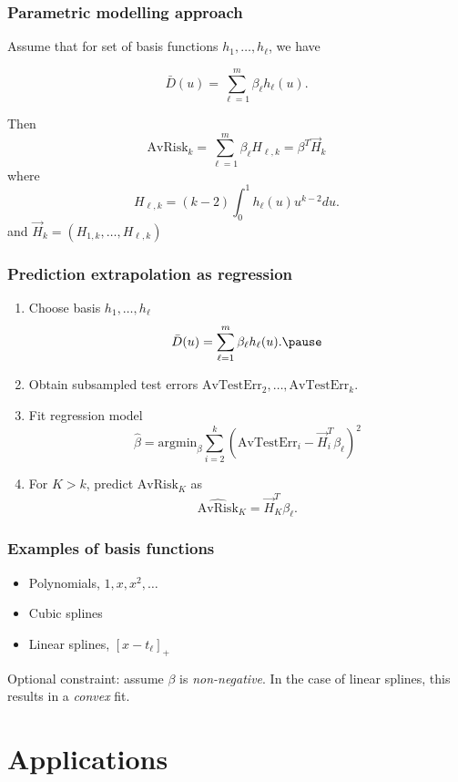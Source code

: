 \documentclass{beamer}
\newcommand{\argmin}{\text{argmin}}
\begin{document}
\begin{frame}
\frametitle{Parametric modelling approach}
Assume that for set of basis functions $h_1,\hdots, h_\ell$, we have

\[
\bar{D}(u) = \sum_{\ell = 1}^m \beta_\ell h_\ell(u).
\]

Then
\[
\text{AvRisk}_{k} = \sum_{\ell = 1}^m \beta_\ell H_{\ell,k} = \beta^T \vec{H}_k
\]
where
\[
H_{\ell,k} = (k-2) \int_0^1 h_\ell(u) u^{k-2} du.
\]
and $\vec{H}_k = (H_{1,k},\hdots, H_{\ell, k})$
\end{frame}

\begin{frame}
\frametitle{Prediction extrapolation as regression}
\begin{enumerate}
\item Choose basis $h_1,\hdots, h_\ell$
\[
\bar{D}(u) = \sum_{\ell = 1}^m \beta_\ell h_\ell(u).\pause
\]
\item Obtain subsampled test errors $\text{AvTestErr}_2,\hdots, \text{AvTestErr}_k$.\pause
\item Fit regression model
\[
\hat{\beta} = \argmin_\beta \sum_{i=2}^{k} \left(\text{AvTestErr}_i - \vec{H}_i^T \beta_\ell\right)^2
\]\pause
\item For $K > k$, predict $\text{AvRisk}_K$ as
\[
\widehat{\text{AvRisk}}_K = \vec{H}_K^T \beta_\ell.
\]
\end{enumerate}
\end{frame}

\begin{frame}
\frametitle{Examples of basis functions}
\begin{itemize}
\item Polynomials, $1, x, x^2, \hdots$
\item Cubic splines
\item Linear splines, $[x-t_\ell]_+$
\end{itemize}

Optional constraint: assume $\beta$ is \emph{non-negative}.  In the case of linear splines, this results in a \emph{convex} fit.
\end{frame}

\section{Applications}

\begin{frame}
\sectionpage
\end{frame}
\end{document}
